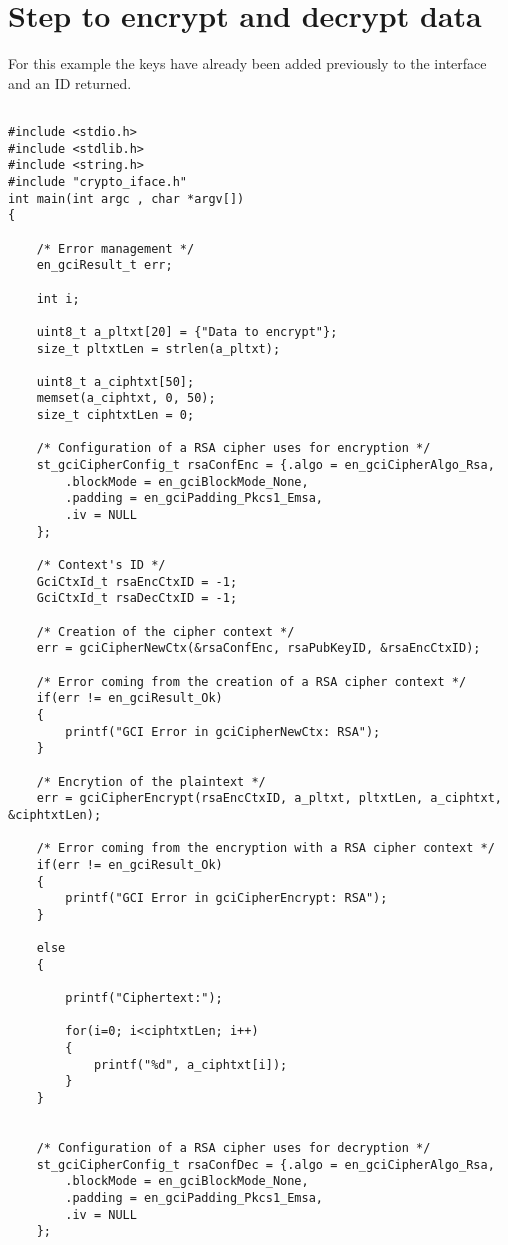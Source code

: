 \section{Step to encrypt and decrypt data}

For this example the keys have already been added previously to the interface 
and an ID returned.

\begin{lstlisting}

#include <stdio.h>
#include <stdlib.h>
#include <string.h>
#include "crypto_iface.h"
int main(int argc , char *argv[])
{

    /* Error management */
    en_gciResult_t err;

    int i;

    uint8_t a_pltxt[20] = {"Data to encrypt"};
    size_t pltxtLen = strlen(a_pltxt);

    uint8_t a_ciphtxt[50];
    memset(a_ciphtxt, 0, 50);
    size_t ciphtxtLen = 0;

    /* Configuration of a RSA cipher uses for encryption */
    st_gciCipherConfig_t rsaConfEnc = {.algo = en_gciCipherAlgo_Rsa,
        .blockMode = en_gciBlockMode_None,
        .padding = en_gciPadding_Pkcs1_Emsa,
        .iv = NULL
    };

    /* Context's ID */
    GciCtxId_t rsaEncCtxID = -1;
    GciCtxId_t rsaDecCtxID = -1;

    /* Creation of the cipher context */
    err = gciCipherNewCtx(&rsaConfEnc, rsaPubKeyID, &rsaEncCtxID);

    /* Error coming from the creation of a RSA cipher context */
    if(err != en_gciResult_Ok)
    {
        printf("GCI Error in gciCipherNewCtx: RSA");
    }

    /* Encrytion of the plaintext */
    err = gciCipherEncrypt(rsaEncCtxID, a_pltxt, pltxtLen, a_ciphtxt, &ciphtxtLen);

    /* Error coming from the encryption with a RSA cipher context */
    if(err != en_gciResult_Ok)
    {
        printf("GCI Error in gciCipherEncrypt: RSA");
    }

    else
    {

        printf("Ciphertext:");

        for(i=0; i<ciphtxtLen; i++)
        {
            printf("%d", a_ciphtxt[i]);
        }
    }


    /* Configuration of a RSA cipher uses for decryption */
    st_gciCipherConfig_t rsaConfDec = {.algo = en_gciCipherAlgo_Rsa,
        .blockMode = en_gciBlockMode_None,
        .padding = en_gciPadding_Pkcs1_Emsa,
        .iv = NULL
    };


\end{lstlisting}

